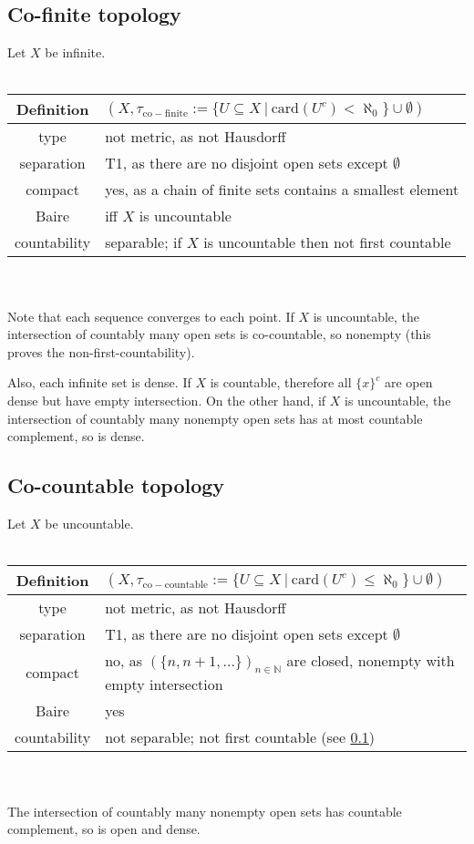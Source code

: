\documentclass{scrartcl}
\newcommand{\N}{\mathbb{N}}
\begin{document}
\subsection{Co-finite topology}
\label{top:co_finite}
Let $X$ be infinite.
\\\\
\begin{tabular}{c | p{}}
    Definition & $(X, \tau_{\mathrm{co-finite}} := \{U \subseteq X \ | \ \mathrm{card}(U^c) < \aleph_0 \} \cup \emptyset)$ \\
    \hline
    type & not metric, as not Hausdorff \\
    separation & T1, as there are no disjoint open sets except $\emptyset$ \\
    compact & yes, as a chain of finite sets contains a smallest element \\
    Baire & iff $X$ is uncountable \\
    countability & separable; if $X$ is uncountable then not first countable
\end{tabular}
\\\\
Note that each sequence converges to each point. If $X$ is uncountable, the intersection of countably many open sets is co-countable, so nonempty (this proves the non-first-countability).

Also, each infinite set is dense. If $X$ is countable, therefore all $\{x\}^c$ are open dense but have empty intersection. On the other hand, if $X$ is uncountable, the intersection of countably many nonempty open sets has at most countable complement, so is dense. 

\subsection{Co-countable topology}
\label{top:co_countable}
Let $X$ be uncountable.
\\\\
\begin{tabular}{c | p{}}
    Definition & $(X, \tau_{\mathrm{co-countable}} := \{U \subseteq X \ | \ \mathrm{card}(U^c) \leq \aleph_0 \} \cup \emptyset)$ \\
    \hline
    type & not metric, as not Hausdorff \\
    separation & T1, as there are no disjoint open sets except $\emptyset$ \\
    compact & no, as $(\{n, n+1, ...\})_{n \in \N}$ are closed, nonempty with empty intersection \\
    Baire & yes \\
    countability & not separable; not first countable (see \ref{top:co_finite})
\end{tabular}
\\\\
The intersection of countably many nonempty open sets has countable complement, so is open and dense.
\end{document}
